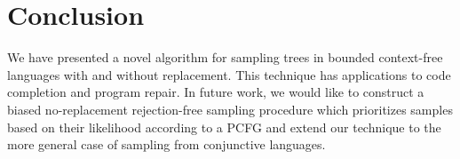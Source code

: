 \documentclass[sigplan,nonacm,anonymous]{acmart}\settopmatter{printfolios=false,printccs=false,printacmref=false}
\begin{document}
  \section{Conclusion}

  We have presented a novel algorithm for sampling trees in bounded context-free languages with and without replacement. This technique has applications to code completion and program repair. In future work, we would like to construct a biased no-replacement rejection-free sampling procedure which prioritizes samples based on their likelihood according to a PCFG and extend our technique to the more general case of sampling from conjunctive languages.
  
\end{document}

